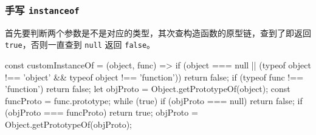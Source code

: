 \subsubsection*{手写 \texttt{instanceof}}

首先要判断两个参数是不是对应的类型，其次查构造函数的原型链，查到了即返回 \texttt{true}，否则一直查到 \texttt{null} 返回 \texttt{false}。

\begin{JavaScript}
const customInstanceOf = (object, func) => {
  if (object === null || (typeof object !== 'object' && typeof object !== 'function'))
    return false;
  if (typeof func !== 'function')
    return false;
  let objProto = Object.getPrototypeOf(object);
  const funcProto = func.prototype;
  while (true) {
    if (objProto === null)
      return false;
    if (objProto === funcProto)
      return true;
    objProto = Object.getPrototypeOf(objProto);
  }
}
\end{JavaScript}